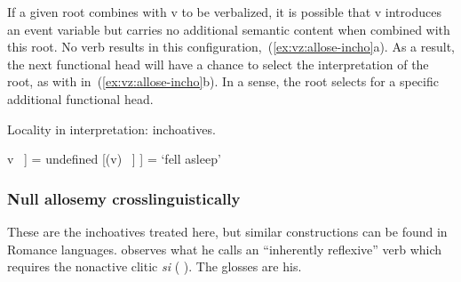 \begin{exe}
\begin{xlist}
\begin{xlist}
\begin{exe}
\begin{xlist}
\begin{xlist}
\begin{exe}
\begin{xlist}
\begin{xlist}
\begin{exe}
\begin{exe}
\begin{xlist}
\begin{exe}
\begin{exe}
\begin{xlist}
\begin{exe}
\begin{exe}
\begin{exe}
\begin{exe}
\begin{exe}
\begin{xlist}
\begin{exe}
\begin{xlist}
\begin{exe}
\begin{exe}
\begin{xlist}
\begin{exe}
\begin{xlist}
\begin{exe}
\begin{exe}
\begin{exe}
\begin{xlist}
\begin{exe}
\begin{exe}
\begin{exe}
\begin{xlist}
If a given root combines with v to be verbalized, it is possible that v introduces an event variable but carries no additional semantic content when combined with this root. No verb results in this configuration,~(\ref{ex:vz:allose-incho}a). As a result, the next functional head will have a chance to select the interpretation of the root, as with {\vz} in~(\ref{ex:vz:allose-incho}b). In a sense, the root selects for a specific additional functional head.
 \begin{exe}
 \ex  Locality in interpretation: inchoatives.\label{ex:vz:allose-incho} 
 \begin{xlist} 
     \ex  {[}v ~\!] = undefined 
     \ex  {[}\textbf{\vz} [(v) ~\!] ] = `fell asleep' 
 \z
\z 

\subsubsection{Null allosemy crosslinguistically}
These are the inchoatives treated here, but similar constructions can be found in Romance languages. \cite{burzio86} observes what he calls an ``inherently reflexive'' verb which requires the nonactive clitic \emph{si} ( ). The glosses are his.
 \begin{exe}
 \ex  {}
 \begin{xlist} 
	
	
	
 \z
{} 
	
 \z 


\end{xlist}
\end{exe}
\end{xlist}
\end{exe}
\end{xlist}
\end{exe}
\end{exe}
\end{exe}
\end{xlist}
\end{exe}
\end{exe}
\end{exe}
\end{xlist}
\end{exe}
\end{xlist}
\end{exe}
\end{exe}
\end{xlist}
\end{exe}
\end{xlist}
\end{exe}
\end{exe}
\end{exe}
\end{exe}
\end{exe}
\end{xlist}
\end{exe}
\end{exe}
\end{xlist}
\end{exe}
\end{exe}
\end{xlist}
\end{xlist}
\end{exe}
\end{xlist}
\end{xlist}
\end{exe}
\end{xlist}
\end{xlist}
\end{exe}
